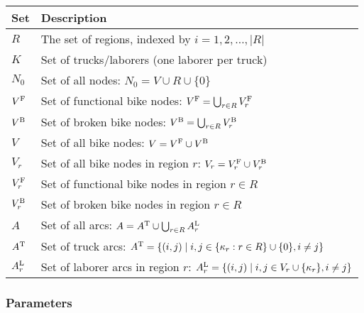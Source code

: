\renewcommand{\arraystretch}{1.25}
\begin{longtable}{p{2cm}p{10cm}}
    \toprule
    Set        & Description                                                                                            \\
    \midrule
    \endhead
    $R$        & The set of regions, indexed by $i=1,2,\ldots,|R|$                                                      \\
    $K$        & Set of trucks/laborers (one laborer per truck)                                                         \\
    $N_0$      & Set of all nodes: $N_0 = V \cup R \cup \{0\}$                                                          \\
    $V^{\text{F}}$   & Set of functional bike nodes: $V^{\text{F}} = \bigcup_{r \in R} V_r^{\text{F}}$                                    \\
    $V^{\text{B}}$   & Set of broken bike nodes: $V^{\text{B}} = \bigcup_{r \in R} V_r^{\text{B}}$                                        \\
    $V$        & Set of all bike nodes: $V = V^{\text{F}} \cup V^{\text{B}}$                                                        \\
    $V_r$      & Set of all bike nodes in region $r$: $V_r = V_r^{\text{F}} \cup V_r^{\text{B}}$                                    \\
    $V_r^{\text{F}}$ & Set of functional bike nodes in region $r \in R$                                                       \\
    $V_r^{\text{B}}$ & Set of broken bike nodes in region $r \in R$                                                           \\
    $A$        & Set of all arcs: $A = A^{\text{T}} \cup \bigcup_{r \in R} A_r^{\text{L}}$                                          \\
    $A^{\text{T}}$   & Set of truck arcs: $A^{\text{T}} = \{(i,j) \mid i,j \in \{\kappa_r : r \in R\} \cup \{0\}, i \neq j\}$       \\
    $A_r^{\text{L}}$ & Set of laborer arcs in region $r$: $A_r^{\text{L}} = \{(i,j) \mid i,j \in V_r \cup \{\kappa_r\}, i \neq j\}$ \\
    \bottomrule
\end{longtable}

\subsubsection{Parameters}

